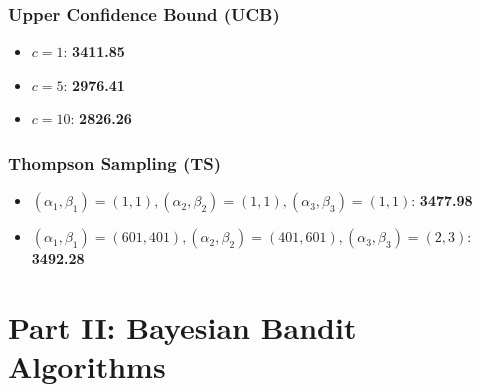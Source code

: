 \documentclass[11pt]{article}
\begin{document}
\subsubsection*{Upper Confidence Bound (UCB)}
\begin{itemize}
    \item \(c = 1\): \textbf{3411.85}
    \item \(c = 5\): \textbf{2976.41}
    \item \(c = 10\): \textbf{2826.26}
\end{itemize}

\subsubsection*{Thompson Sampling (TS)}
\begin{itemize}
    \item \((\alpha_1, \beta_1) = (1,1), (\alpha_2, \beta_2) = (1,1), (\alpha_3, \beta_3) = (1,1)\): \textbf{3477.98}
    \item \((\alpha_1, \beta_1) = (601,401), (\alpha_2, \beta_2) = (401,601), (\alpha_3, \beta_3) = (2,3)\): \textbf{3492.28}
\end{itemize}



\newpage
\section{Part II: Bayesian Bandit Algorithms}



\appendix
\end{document}
